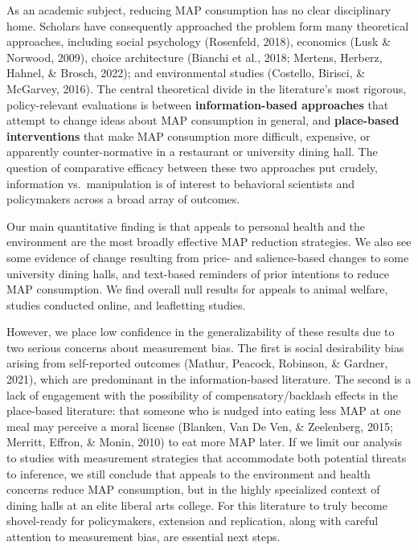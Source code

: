 \documentclass[
  man]{apa6}
\begin{document}
As an academic subject, reducing MAP consumption has no clear disciplinary home. Scholars have consequently approached the problem form many theoretical approaches, including social psychology (Rosenfeld, 2018), economics (Lusk \& Norwood, 2009), choice architecture (Bianchi et al., 2018; Mertens, Herberz, Hahnel, \& Brosch, 2022); and environmental studies (Costello, Birisci, \& McGarvey, 2016). The central theoretical divide in the literature's most rigorous, policy-relevant evaluations is between \textbf{information-based approaches} that attempt to change ideas about MAP consumption in general, and \textbf{place-based interventions} that make MAP consumption more difficult, expensive, or apparently counter-normative in a restaurant or university dining hall. The question of comparative efficacy between these two approaches \textemdash put crudely, information vs.~manipulation \textemdash is of interest to behavioral scientists and policymakers across a broad array of outcomes.

Our main quantitative finding is that appeals to personal health and the environment are the most broadly effective MAP reduction strategies. We also see some evidence of change resulting from price- and salience-based changes to some university dining halls, and text-based reminders of prior intentions to reduce MAP consumption. We find overall null results for appeals to animal welfare, studies conducted online, and leafletting studies.

However, we place low confidence in the generalizability of these results due to two serious concerns about measurement bias. The first is social desirability bias arising from self-reported outcomes (Mathur, Peacock, Robinson, \& Gardner, 2021), which are predominant in the information-based literature. The second is a lack of engagement with the possibility of compensatory/backlash effects in the place-based literature: that someone who is nudged into eating less MAP at one meal may perceive a moral license (Blanken, Van De Ven, \& Zeelenberg, 2015; Merritt, Effron, \& Monin, 2010) to eat more MAP later. If we limit our analysis to studies with measurement strategies that accommodate both potential threats to inference, we still conclude that appeals to the environment and health concerns reduce MAP consumption, but in the highly specialized context of dining halls at an elite liberal arts college. For this literature to truly become shovel-ready for policymakers, extension and replication, along with careful attention to measurement bias, are essential next steps.
\end{document}
